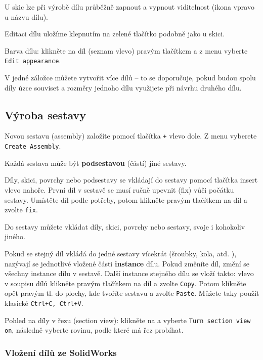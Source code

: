 U skic lze při výrobě dílu průběžně zapnout a vypnout viditelnost (ikona  vpravo u názvu dílu).

Editaci dílu uložíme klepnutím na zelené tlačítko podobně jako u skici.

Barva dílu: klikněte na díl (seznam vlevo) pravým tlačítkem a  z menu vyberte {\tt Edit appearance}. 

V jedné záložce  můžete vytvořit více dílů -- to se doporučuje, pokud budou spolu díly úzce souviset a rozměry jednoho dílu využijete při návrhu druhého dílu. 



\subsection{Výroba sestavy} \label{sestava:vyroba} 

Novou sestavu (assembly) založíte pomocí tlačítka \texttt{+} vlevo dole. Z menu vyberete {\tt Create Assembly}.

Každá sestava může být \textbf{podsestavou} (částí) jiné sestavy. 

Díly, skici, povrchy nebo podsestavy se vkládají do sestavy pomocí tlačítka insert vlevo nahoře. 
První díl v sestavě se musí ručně upevnit (fix) vůči počátku sestavy. 
Umístěte díl podle potřeby, potom klikněte pravým tlačítkem na díl a zvolte {\tt fix}.

Do sestavy můžete vkládat díly, skici, povrchy nebo sestavy, svoje i kohokoliv jiného. 

Pokud se stejný díl vkládá do jedné sestavy vícekrát (šroubky, kola, atd. ), nazývají se jednotlivé vložené části \textbf{instance} dílu. 
Pokud změníte díl, změní se všechny instance dílu v sestavě.
Další instance stejného dílu se vloží takto: vlevo v soupisu dílů klikněte pravým tlačítkem na díl a zvolte {\tt Copy}. 
Potom klikněte opět pravým tl. do plochy, kde tvoříte sestavu a zvolte {\tt Paste}. Můžete taky použít klasické {\tt Ctrl+C, Ctrl+V}. 

Pohled na díly v řezu (section view): klikněte na  a vyberte {\tt Turn section view on}, následně vyberte rovinu, podle které má řez probíhat. 

\subsubsection{Vložení dílů ze SolidWorks}

